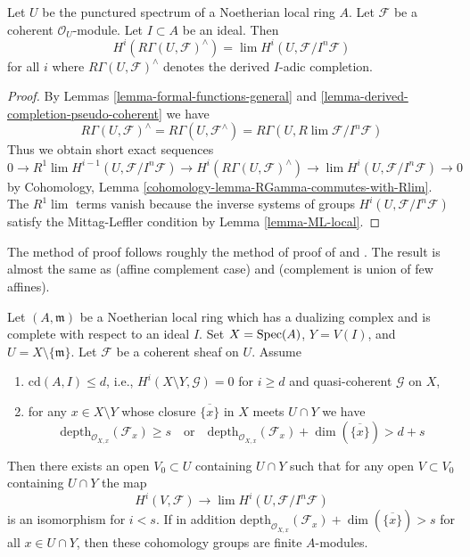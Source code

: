 \begin{lemma}
\label{lemma-compare-with-derived-completion}
Let $U$ be the punctured spectrum of a Noetherian local ring $A$.
Let $\mathcal{F}$ be a coherent $\mathcal{O}_U$-module.
Let $I \subset A$ be an ideal. Then
$$
H^i(R\Gamma(U, \mathcal{F})^\wedge) =
\lim H^i(U, \mathcal{F}/I^n\mathcal{F})
$$
for all $i$ where $R\Gamma(U, \mathcal{F})^\wedge$ denotes
the derived $I$-adic completion.
\end{lemma}

\begin{proof}
By Lemmas \ref{lemma-formal-functions-general} and
\ref{lemma-derived-completion-pseudo-coherent} we have
$$
R\Gamma(U, \mathcal{F})^\wedge =
R\Gamma(U, \mathcal{F}^\wedge) =
R\Gamma(U, R\lim \mathcal{F}/I^n\mathcal{F})
$$
Thus we obtain short exact sequences
$$
0 \to R^1\lim H^{i - 1}(U, \mathcal{F}/I^n\mathcal{F}) \to
H^i(R\Gamma(U, \mathcal{F})^\wedge) \to
\lim H^i(U, \mathcal{F}/I^n\mathcal{F}) \to 0
$$
by Cohomology, Lemma \ref{cohomology-lemma-RGamma-commutes-with-Rlim}.
The $R^1\lim$ terms vanish because the inverse systems of groups
$H^i(U, \mathcal{F}/I^n\mathcal{F})$ satisfy the Mittag-Leffler condition
by Lemma \ref{lemma-ML-local}.
\end{proof}

\begin{theorem}
\label{theorem-algebraization-formal-sections}
\begin{reference}
The method of proof follows roughly the method of
proof of \cite[Theorem 1]{Faltings-algebraisation}
and \cite[Satz 2]{Faltings-uber}.
The result is almost the same as
\cite[Theorem 1.1]{MRaynaud-paper} (affine complement case) and
\cite[Theorem 3.9]{MRaynaud-book} (complement is union of few affines).
\end{reference}
Let $(A, \mathfrak m)$ be a Noetherian local ring which has a
dualizing complex and is complete with respect to an ideal $I$.
Set $X = \mathop{\mathrm{Spec}}(A)$, $Y = V(I)$, and $U = X \setminus \{\mathfrak m\}$.
Let $\mathcal{F}$ be a coherent sheaf on $U$.
Assume
\begin{enumerate}
\item $\text{cd}(A, I) \leq d$, i.e.,
$H^i(X \setminus Y, \mathcal{G}) = 0$ for $i \geq d$ and
quasi-coherent $\mathcal{G}$ on $X$,
\item for any $x \in X \setminus Y$ whose closure $\overline{\{x\}}$
in $X$ meets $U \cap Y$ we have
$$
\text{depth}_{\mathcal{O}_{X, x}}(\mathcal{F}_x) \geq s
\quad\text{or}\quad
\text{depth}_{\mathcal{O}_{X, x}}(\mathcal{F}_x)
+ \dim(\overline{\{x\}}) > d + s
$$
\end{enumerate}
Then there exists an open $V_0 \subset U$ containing $U \cap Y$
such that for any open $V \subset V_0$ containing $U \cap Y$
the map
$$
H^i(V, \mathcal{F}) \to \lim H^i(U, \mathcal{F}/I^n\mathcal{F})
$$
is an isomorphism for $i < s$. If in addition
$
\text{depth}_{\mathcal{O}_{X, x}}(\mathcal{F}_x) +
\dim(\overline{\{x\}}) > s
$
for all $x \in U \cap Y$, then these cohomology groups are finite $A$-modules.
\end{theorem}

